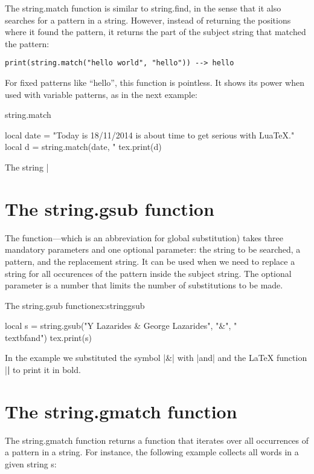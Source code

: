 The string.match function is similar to string.find, in the sense that it also
searches for a pattern in a string. However, instead of returning the positions
where it found the pattern, it returns the part of the subject string that matched
the pattern:
\begin{verbatim}
print(string.match("hello world", "hello")) --> hello
\end{verbatim}
For fixed patterns like \enquote{hello}, this function is pointless. It shows its power when
used with variable patterns, as in the next example:

\begin{texexample}{string.match}{}
\begin{luacode}
local date = "Today is 18/11/2014 is about time to get serious with LuaTeX."
local d = string.match(date, "%
tex.print(d) 
\end{luacode}
\end{texexample}
The string |%

\section{The string.gsub function}

The  function---which is an abbreviation for global substitution) takes three mandatory parameters and one optional parameter: the string to be searched, a pattern, and the replacement string. It can be used when we need to replace a string for all occurences of the pattern inside the subject string. The optional parameter is a number that limits the number of substitutions to be made.

\begin{texexample}{The string.gsub function}{ex:stringgsub}
\begin{luacode}
   local s = string.gsub("Y Lazarides & George Lazarides", "&", "\\textbf{and}") 
   tex.print(s)
\end{luacode}
\end{texexample}
In the example we substituted the symbol |&| with |and| and the LaTeX function |\textbf| to print it in bold.


\section{The string.gmatch function}
The string.gmatch function returns a function that iterates over all occurrences
of a pattern in a string. For instance, the following example collects all words in
a given string s:

